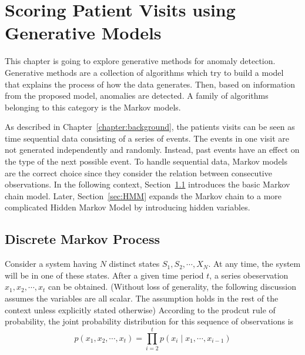 \chapter{Scoring Patient Visits using Generative Models}
\label{chapter:generative}
This chapter is going to explore generative methods for anomaly detection. Generative methods are a collection of algorithms which try to build a model that explains the process of how the data generates. Then, based on information from the proposed model, anomalies are detected. A family of algorithms belonging to this category is the Markov models.

As described in Chapter~\ref{chapter:background}, the patients visits can be seen as time sequential data consisting of a series of events. The events in one visit are not generated independently and randomly. Instead, past events have an effect on the type of the next possible event. To handle sequential data, Markov models are the correct choice since they consider the relation between consecutive observations. In the following context, Section~\ref{sec:MM} introduces the basic Markov chain model. Later, Section~\ref{sec:HMM} expands the Markov chain to a more complicated Hidden Markov Model by introducing hidden variables.

\section{Discrete Markov Process}
\label{sec:MM}
Consider a system having \(N\) distinct states \(S_1, S_2, \cdots, X_N\). At any time, the system will be in one of these states. After a given time period \(t\), a series obeservation \(x_1, x_2, \cdots, x_t\) can be obtained. (Without loss of generality, the following discussion assumes the variables are all scalar. The assumption holds in the rest of the context unless explicitly stated otherwise) According to the prodcut rule of probability, the joint probability distribution for this sequence of observations is
\begin{equation}
	p(x_1, x_2, \cdots, x_t) = \prod_{i = 2}^{t} p(x_i \mid x_1, \cdots, x_{i-1})
\end{equation}

